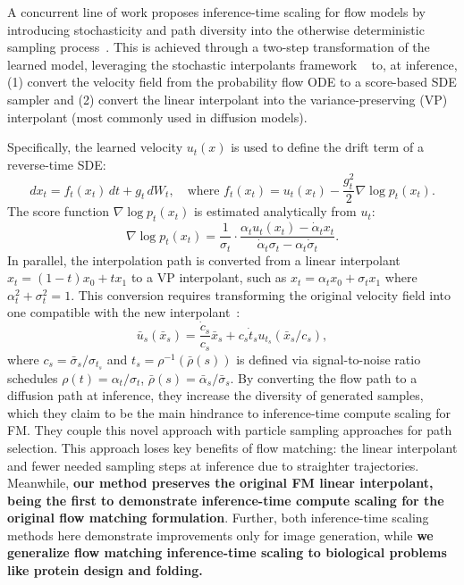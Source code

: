 \documentclass{article} %
\begin{document}
A concurrent line of work proposes inference-time scaling for flow models by introducing stochasticity and path diversity into the otherwise deterministic sampling process~\cite{kim2025flowits}. This is achieved through a two-step transformation of the learned model, leveraging the stochastic interpolants framework ~\cite{albergo2023stochastic_interpolants} to, at inference, (1) convert the velocity field from the probability flow ODE to a score-based SDE sampler and (2) convert the linear interpolant into the variance-preserving (VP) interpolant (most commonly used in diffusion models).

Specifically, the learned velocity \( u_t(x) \) is used to define the drift term of a reverse-time SDE:
\[
d x_t = f_t(x_t)\,dt + g_t\,dW_t, \quad \text{where } f_t(x_t) = u_t(x_t) - \frac{g_t^2}{2} \nabla \log p_t(x_t).
\]
The score function \( \nabla \log p_t(x_t) \) is estimated analytically from \( u_t \):
\[
\nabla \log p_t(x_t) = \frac{1}{\sigma_t} \cdot \frac{\alpha_t u_t(x_t) - \dot{\alpha}_t x_t}{\dot{\alpha}_t \sigma_t - \alpha_t \dot{\sigma}_t}.
\]
In parallel, the interpolation path is converted from a linear interpolant \( x_t = (1 - t)x_0 + t x_1 \) to a VP interpolant, such as \( x_t = \alpha_t x_0 + \sigma_t x_1 \) where \(\alpha_t^2 + \sigma_t^2 = 1\). This conversion requires transforming the original velocity field into one compatible with the new interpolant~\cite{kim2025flowits}:
\[
\bar{u}_s(\bar{x}_s) = \frac{\dot{c}_s}{c_s} \bar{x}_s + c_s \dot{t}_s u_{t_s}(\bar{x}_s / c_s),
\]
where \(c_s = \bar{\sigma}_s / \sigma_{t_s}\) and \(t_s = \rho^{-1}(\bar{\rho}(s))\) is defined via signal-to-noise ratio schedules \(\rho(t) = \alpha_t/\sigma_t\), \(\bar{\rho}(s) = \bar{\alpha}_s/\bar{\sigma}_s\). By converting the flow path to a diffusion path at inference, they increase the diversity of generated samples, which they claim to be the main hindrance to inference-time compute scaling for FM. They couple this novel approach with particle sampling approaches for path selection. This approach loses key benefits of flow matching: the linear interpolant and fewer needed sampling steps at inference due to straighter trajectories. Meanwhile, \textbf{our method preserves the original FM linear interpolant, being the first to demonstrate inference-time compute scaling for the original flow matching formulation}. Further, both inference-time scaling methods here demonstrate improvements only for image generation, while \textbf{we generalize flow matching inference-time scaling to biological problems like protein design and folding.}
\end{document}
